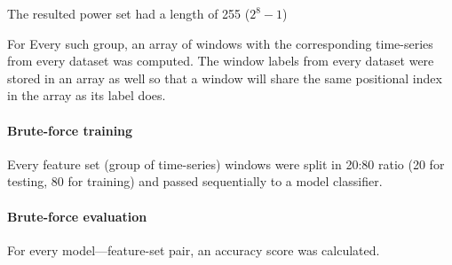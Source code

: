 The resulted power set had a length of 255 (\(2^8 - 1\))

For Every such group, an array of windows with the corresponding time-series from every dataset was computed. The window labels from every dataset were stored in an array as well so that a window will share the same positional index in the array as its label does.

\paragraph{Brute-force training}

Every feature set (group of time-series) windows were split in 20:80 ratio (20 for testing, 80 for training) and passed sequentially to a model classifier.

\paragraph{Brute-force evaluation}

For every model---feature-set pair, an accuracy score was calculated.
